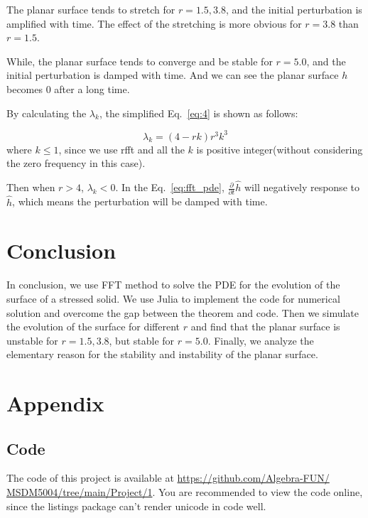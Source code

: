 \documentclass[runningheads]{llncs}
\begin{document}
The planar surface tends to stretch for $r=1.5,3.8$, and the initial perturbation is amplified with time.
The effect of the stretching is more obvious for $r=3.8$ than $r=1.5$.

While, the planar surface tends to converge and be stable for $r=5.0$, and the initial perturbation is damped with time.
And we can see the planar surface $h$ becomes $0$ after a long time.

By calculating the $\lambda_k$, the simplified Eq.~\eqref{eq:4} is shown as follows:

\begin{equation}
    \label{eq:4}
    \lambda_k = (4-rk)r^3k^3
\end{equation}
where $k \leq 1$, since we use rfft and all the $k$ is positive integer(without considering the zero frequency in this case).

Then when $r > 4$, $\lambda_k < 0$. 
In the Eq.~\eqref{eq:fft_pde}, $\frac{\partial}{\partial t}\hat{h}$ will negatively response to $\hat{h}$, which means the perturbation will be damped with time.

\section{Conclusion}

In conclusion, we use FFT method to solve the PDE for the evolution of the surface of a stressed solid. 
We use Julia to implement the code for numerical solution and overcome the gap between the theorem and code.
Then we simulate the evolution of the surface for different $r$ and find that the planar surface is unstable for $r=1.5,3.8$, but stable for $r=5.0$.
Finally, we analyze the elementary reason for the stability and instability of the planar surface.






\newpage
\section*{Appendix}
\subsection*{Code}

The code of this project is available at \url{https://github.com/Algebra-FUN/
MSDM5004/tree/main/Project/1}. You are recommended to view the code online, since the listings package can't render unicode in code well.




\end{document}
